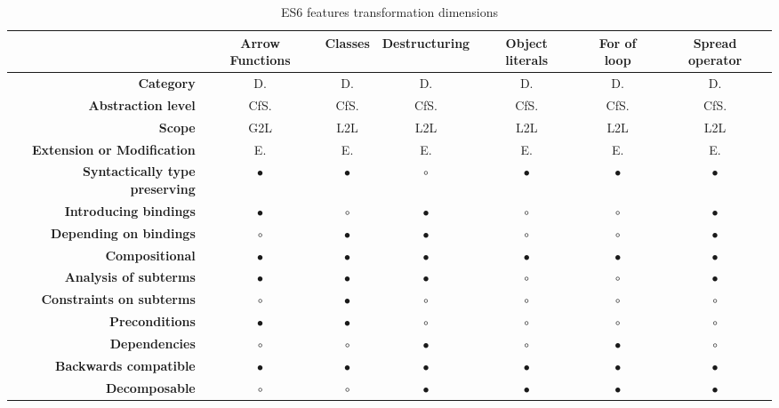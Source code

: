 \begin{landscape}		
\centering

\begin{table}[h]
\caption{ES6 features transformation dimensions}
\label{full-table}
\begin{tabular}{rcccccc}
\hline
& {\bf Arrow Functions} & {\bf Classes} & {\bf Destructuring} & {\bf Object literals} & {\bf For of loop} & {\bf Spread operator} \\ \hline
{\bf Category} & D. & D. & D. & D. & D. & D. \\
{\bf Abstraction level} & CfS. & CfS. & CfS. & CfS. & CfS. & CfS. \\
{\bf Scope} & G2L & L2L & L2L & L2L & L2L & L2L \\
{\bf Extension or Modification} & E. & E. & E. & E. & E. & E. \\
{\bf Syntactically type preserving} & $\bullet$ & $\bullet$ & $\circ$ & $\bullet$ & $\bullet$ & $\bullet$ \\
{\bf Introducing bindings} & $\bullet$ & $\circ$ & $\bullet$ & $\circ$ & $\circ$ & $\bullet$ \\
{\bf Depending on bindings} & $\circ$ & $\bullet$ & $\bullet$ & $\circ$ & $\circ$ & $\bullet$ \\
{\bf Compositional} & $\bullet$ & $\bullet$ & $\bullet$ & $\bullet$ & $\bullet$ & $\bullet$ \\
{\bf Analysis of subterms} & $\bullet$ & $\bullet$ & $\bullet$ & $\circ$ & $\circ$ & $\bullet$  \\
{\bf Constraints on subterms} & $\circ$ & $\bullet$ & $\circ$ & $\circ$ & $\circ$ & $\circ$   \\
{\bf Preconditions} & $\bullet$ & $\bullet$ & $\circ$ & $\circ$ & $\circ$ & $\circ$   \\
{\bf Dependencies}  & $\circ$ & $\circ$ & $\bullet$ & $\circ$ & $\bullet$ & $\circ$   \\
{\bf Backwards compatible} & $\bullet$ & $\bullet$ & $\bullet$ & $\bullet$ & $\bullet$ & $\bullet$  \\
{\bf Decomposable} & $\circ$ & $\circ$ & $\bullet$ & $\bullet$ & $\bullet$ & $\bullet$  \\ \hline
\end{tabular}
\vspace*{0.5cm}
\newline


\end{table}
\end{landscape}
